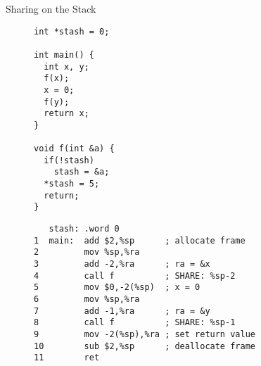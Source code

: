 \documentclass[acmsmall,review,anonymous]{acmart}\settopmatter{printfolios=true,printccs=false,printacmref=false}
\begin{document}
\begin{figure}
\begin{subfigure}{.65\textwidth}
\vspace{\abovedisplayskip}

\end{subfigure}

\caption{Sharing on the Stack}
\label{fig:passingsimple}
\end{figure}

\begin{figure}
  \centering
  \begin{subfigure}{.2\textwidth}
{\small
\begin{verbatim}
int *stash = 0;

int main() {
  int x, y;
  f(x);
  x = 0;
  f(y);
  return x;
}

void f(int &a) {
  if(!stash)
    stash = &a;
  *stash = 5;
  return;
}
\end{verbatim}
}
  \end{subfigure}
  \begin{subfigure}{.49\textwidth}
{\small
\begin{verbatim}
   stash: .word 0
1  main:  add $2,%sp      ; allocate frame
2         mov %sp,%ra
3         add -2,%ra      ; ra = &x
4         call f          ; SHARE: %sp-2
5         mov $0,-2(%sp)  ; x = 0
6         mov %sp,%ra
7         add -1,%ra      ; ra = &y
8         call f          ; SHARE: %sp-1
9         mov -2(%sp),%ra ; set return value
10        sub $2,%sp      ; deallocate frame
11        ret


\end{verbatim}}
\end{subfigure}
\end{figure}
\end{document}
